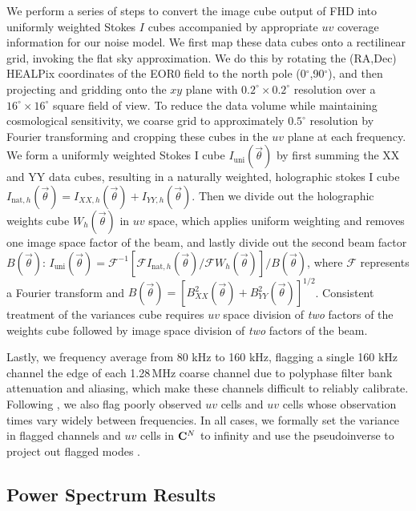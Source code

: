 We perform a series of steps to convert the image cube output of FHD into uniformly weighted Stokes $I$ cubes accompanied by appropriate $uv$ coverage information for our noise model. We first map these data cubes onto a rectilinear grid, invoking the flat sky approximation. We do this by rotating the (RA,Dec) HEALPix coordinates of the EOR0 field to the north pole (0$^\circ$,90$^\circ$), and then projecting and gridding onto the $xy$ plane with $0.2^\circ\times0.2^\circ$ resolution over a $16^\circ\times16^\circ$ square field of view. To reduce the data volume while maintaining cosmological sensitivity, we coarse grid to approximately $0.5^\circ$ resolution by Fourier transforming and cropping these cubes in the $uv$ plane at each frequency. We form a uniformly weighted Stokes I cube $I_{\text{uni}}(\vec{\theta})$ by first summing the XX and YY data cubes, resulting in a naturally weighted, holographic stokes I cube $I_{\text{nat},h}(\vec{\theta})  = I_{XX,h}(\vec{\theta})+I_{YY,h}(\vec{\theta})$. Then we divide out the holographic weights cube $W_h({\vec{\theta}})$ in $uv$ space, which applies uniform weighting and removes one image space factor of the beam, and lastly divide out the second beam factor $B(\vec{\theta})$: $I_{\text{uni}}(\vec{\theta}) = \mathcal{F}^{-1}[\mathcal{F}I_{\text{nat},h}(\vec{\theta})/\mathcal{F}W_h(\vec{\theta})]/B(\vec{\theta})$, where $\mathcal{F}$ represents a Fourier transform and $B(\vec{\theta}) = [B_{XX}^2(\vec{\theta})+B_{YY}^2(\vec{\theta})]^{1/2}$. Consistent treatment of the variances cube requires $uv$ space division of {\it two} factors of the weights cube followed by image space division of {\it two} factors of the beam.

Lastly, we frequency average from 80 kHz to 160 kHz, flagging a single 160 kHz channel the edge of each 1.28\,MHz coarse channel due to polyphase filter bank attenuation and aliasing, which make these channels difficult to reliably calibrate. Following \citet{X13}, we also flag poorly observed $uv$ cells and $uv$ cells whose observation times vary widely between frequencies. In all cases, we formally set the variance in flagged channels and $uv$ cells in $\mathbf{C}^N$ to infinity and use the pseudoinverse to project out flagged modes \citep{X13}. 
 
  
\subsection{Power Spectrum Results}
 
